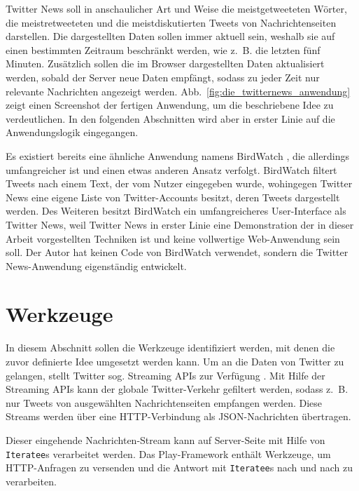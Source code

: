 Twitter News soll in anschaulicher Art und Weise die meistgetweeteten Wörter, die meistretweeteten und die meistdiskutierten Tweets von Nachrichtenseiten darstellen.
Die dargestellten Daten sollen immer aktuell sein, weshalb sie auf einen bestimmten Zeitraum beschränkt werden, wie z.~B. die letzten fünf Minuten.
Zusätzlich sollen die im Browser dargestellten Daten aktualisiert werden, sobald der Server neue Daten empfängt, sodass zu jeder Zeit nur relevante Nachrichten angezeigt werden.
Abb.~\ref{fig:die_twitternews_anwendung} zeigt einen Screenshot der fertigen Anwendung, um die beschriebene Idee zu verdeutlichen.
In den folgenden Abschnitten wird aber in erster Linie auf die Anwendungslogik eingegangen.

Es existiert bereits eine ähnliche Anwendung namens BirdWatch \cite[vgl.][]{bird_watch}, die allerdings umfangreicher ist und einen etwas anderen Ansatz verfolgt.
BirdWatch filtert Tweets nach einem Text, der vom Nutzer eingegeben wurde, wohingegen Twitter News eine eigene Liste von Twitter-Accounts besitzt, deren Tweets dargestellt werden.
Des Weiteren besitzt BirdWatch ein umfangreicheres User-Interface als Twitter News, weil Twitter News in erster Linie eine Demonstration der in dieser Arbeit vorgestellten Techniken ist und keine vollwertige Web-Anwendung sein soll.
Der Autor hat keinen Code von BirdWatch verwendet, sondern die Twitter News-Anwendung eigenständig entwickelt.


\section{Werkzeuge} %
\label{sec:werkzeuge}

In diesem Abschnitt sollen die Werkzeuge identifiziert werden, mit denen die zuvor definierte Idee umgesetzt werden kann.
Um an die Daten von Twitter zu gelangen, stellt Twitter sog. Streaming APIs zur Verfügung \cite[vgl.][]{twitter_streaming_apis}.
Mit Hilfe der Streaming APIs kann der globale Twitter-Verkehr gefiltert werden, sodass z.~B. nur Tweets von ausgewählten Nachrichtenseiten empfangen werden.
Diese Streams werden über eine HTTP-Verbindung als JSON-Nachrichten übertragen.

Dieser eingehende Nachrichten-Stream kann auf Server-Seite mit Hilfe von \lstinline|Iteratee|s verarbeitet werden.
Das Play-Framework enthält Werkzeuge, um HTTP-Anfragen zu versenden und die Antwort mit \lstinline|Iteratee|s nach und nach zu verarbeiten.

